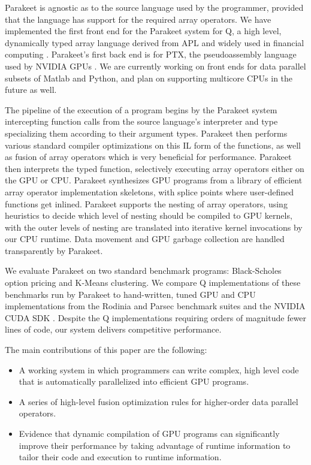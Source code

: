 \documentclass[preprint]{sigplanconf}
\begin{document}
Parakeet is agnostic as to the source language used by the programmer, provided
that the language has support for the required array operators.  We have
implemented the first front end for the Parakeet system for Q, a high level,
dynamically typed array language derived from APL and widely used in financial
computing \cite{Borr08}. Parakeet's first back end is for PTX, the
pseudoassembly language used by NVIDIA GPUs \cite{NvidCU}.  We are currently
working on front ends for data parallel subsets of Matlab and Python, and plan
on supporting multicore CPUs in the future as well.

The pipeline of the execution of a program begins by the Parakeet system
intercepting function calls from the source language's interpreter and type
specializing them according to their argument types.  Parakeet then performs
various standard compiler optimizations on this IL form of the functions, as
well as fusion of array operators which is very beneficial for performance.
Parakeet then interprets the typed function, selectively executing array
operators either on the GPU or CPU. Parakeet synthesizes GPU
programs from a library of efficient array operator implementation skeletons,
with splice points where user-defined functions get inlined. Parakeet supports
the nesting of array operators, using heuristics to decide which level of
nesting should be compiled to GPU kernels, with the outer levels of nesting are
translated into iterative kernel invocations by our CPU runtime.  Data movement
and GPU garbage collection are handled transparently by Parakeet.

We evaluate Parakeet on two standard benchmark programs: Black-Scholes option
pricing and K-Means clustering.  We compare Q implementations of these
benchmarks run by Parakeet to hand-written, tuned GPU and CPU implementations
from the Rodinia \cite{Che09} and Parsec \cite{Bien08} benchmark suites and the
NVIDIA CUDA SDK \cite{NvidSD}.  Despite the Q implementations requiring orders
of magnitude fewer lines of code, our system delivers competitive performance.

The main contributions of this paper are the following:

\begin{itemize}
\item A working system in which programmers can write complex, high level code
that is automatically parallelized into efficient GPU programs.
\item A series of high-level fusion optimization rules for higher-order data
parallel operators.
\item Evidence that dynamic compilation of GPU programs can significantly
improve their performance by taking advantage of runtime information to
tailor their code and execution to runtime information.
\end{itemize}
\end{document}
